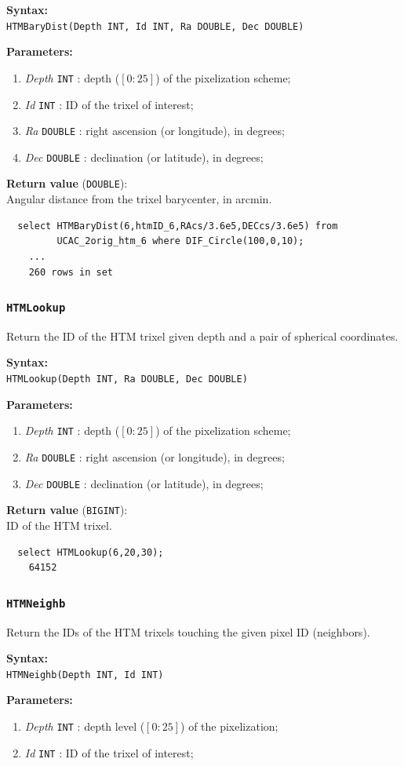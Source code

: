 \documentclass[10pt,titlepage]{article}
\newcommand{\syntax}[1]
{
  \bigskip
  \noindent
  \textbf{Syntax:} \\ 
  \indent \texttt{#1}
}
\newenvironment{parameters}
{
  \medskip
  \noindent
  \textbf{Parameters:}
  \begin{enumerate}
}
{
  \end{enumerate}
}
\newcommand{\param}[2]
{
  \item \textit{#1} \texttt{#2} 
}
\newcommand{\return}[1]
{
  \medskip
  \noindent
  \textbf{Return value} (\texttt{#1}): \\
  \indent
}
\newcommand{\example}
{
\medskip
\noindent{\textbf{Example:}}
}
\begin{document}
\syntax{HTMBaryDist(Depth INT, Id INT, Ra DOUBLE, Dec DOUBLE)}

\begin{parameters}
  \param{Depth}{INT}: depth ($[0:25]$) of the pixelization scheme;
  \param{Id}{INT}: ID of the trixel of interest;
  \param{Ra}{DOUBLE}: right ascension (or longitude), in degrees;
  \param{Dec}{DOUBLE}: declination (or latitude), in degrees;
\end{parameters}

\return{DOUBLE} Angular distance from the trixel barycenter, in arcmin.

\example
%
\begin{verbatim}
  select HTMBaryDist(6,htmID_6,RAcs/3.6e5,DECcs/3.6e5) from
         UCAC_2orig_htm_6 where DIF_Circle(100,0,10);
    ...
    260 rows in set
\end{verbatim}




\subsubsection{{\tt HTMLookup}}
Return the ID of the HTM trixel given depth and a pair of spherical coordinates.

\syntax{HTMLookup(Depth INT, Ra DOUBLE, Dec DOUBLE)}

\begin{parameters}
  \param{Depth}{INT}: depth ($[0:25]$) of the pixelization scheme;
  \param{Ra}{DOUBLE}: right ascension (or longitude), in degrees;
  \param{Dec}{DOUBLE}: declination (or latitude), in degrees;
\end{parameters}

\return{BIGINT} ID of the HTM trixel.

\example
%
\begin{verbatim}
  select HTMLookup(6,20,30);
    64152
\end{verbatim}




\subsubsection{{\tt HTMNeighb}}
Return the IDs of the HTM trixels touching the given pixel ID (neighbors).

\syntax{HTMNeighb(Depth INT, Id INT)}

\begin{parameters}
  \param{Depth}{INT}: depth level ($[0:25]$) of the pixelization;
  \param{Id}{INT}: ID of the trixel of interest;
\end{parameters}
\end{document}
